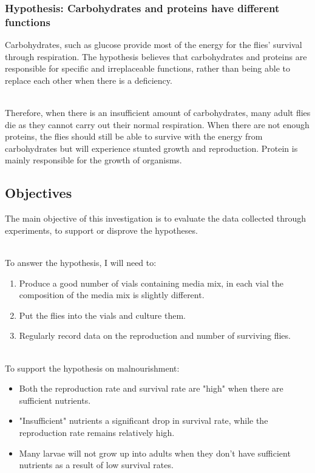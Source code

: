 \documentclass{article}
\begin{document}
\subsubsection{Hypothesis: Carbohydrates and proteins have different functions}

Carbohydrates, such as glucose provide most of the energy for the flies' survival through respiration. The hypothesis believes that carbohydrates and proteins are responsible for specific and irreplaceable functions, rather than being able to replace each other when there is a deficiency.

\noindent\\
Therefore, when there is an insufficient amount of carbohydrates, many adult flies die as they cannot carry out their normal respiration. When there are not enough proteins, the flies should still be able to survive with the energy from carbohydrates but will experience stunted growth and reproduction. Protein is mainly responsible for the growth of organisms.

\subsection{Objectives}

The main objective of this investigation is to evaluate the data collected through experiments, to support or disprove the hypotheses.

\noindent\\
To answer the hypothesis, I will need to:

\begin{enumerate}
    \item Produce a good number of vials containing media mix, in each vial the composition of the media mix is slightly different.
    \item Put the flies into the vials and culture them.
    \item Regularly record data on the reproduction and number of surviving flies.
\end{enumerate}

\noindent\\
To support the hypothesis on malnourishment:

\begin{itemize}
    \item Both the reproduction rate and survival rate are "high" when there are sufficient nutrients.
    \item "Insufficient" nutrients a significant drop in survival rate, while the reproduction rate remains relatively high.
    \item Many larvae will not grow up into adults when they don't have sufficient nutrients as a result of low survival rates.
\end{itemize}
\end{document}
